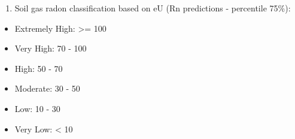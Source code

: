 \documentclass[
  12pt,
]{article}
\providecommand{\tightlist}{%
  \setlength{\itemsep}{0pt}\setlength{\parskip}{0pt}}
\begin{document}
\begin{enumerate}
\def\labelenumi{\alph{enumi})}
\setcounter{enumi}{3}
\tightlist
\item
  Soil gas radon classification based on eU (Rn predictions - percentile
  75\%):
\end{enumerate}

\begin{itemize}
\tightlist
\item
  Extremely High: \textgreater= 100
\item
  Very High: 70 - 100
\item
  High: 50 - 70
\item
  Moderate: 30 - 50
\item
  Low: 10 - 30
\item
  Very Low: \textless{} 10
\end{itemize}
\end{document}
